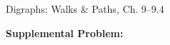 \documentclass[handout]{mcs}
\begin{document}


\begin{staffnotes}
Digraphs: Walks \& Paths, Ch. 9--9.4
\end{staffnotes}




\textbf{Supplemental Problem:}



\iffalse
\pinput{CP_covering_edges}  %
\pinput{CP_tournament_chain}
\fi


\end{document}
